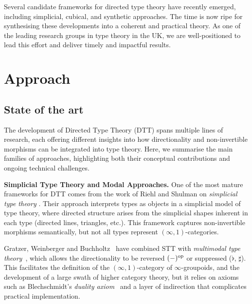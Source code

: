 \documentclass[a4paper,11pt]{article}
\renewcommand{\paragraph}[1]{\textbf{#1.}}
\begin{document}
Several candidate frameworks for directed type theory have recently
emerged, including simplicial, cubical, and synthetic approaches. The
time is now ripe for synthesising these developments into a coherent
and practical theory. As one of the leading research groups in type
theory in the UK, we are well-positioned to lead this effort and
deliver timely and impactful results.

\section{Approach} %


\subsection{State of the art}\label{state-of-the-art}

The development of Directed Type Theory (DTT) spans multiple lines of
research, each offering different insights into how directionality and
non-invertible morphisms can be integrated into type theory. Here, we
summarise the main families of approaches, highlighting both their
conceptual contributions and ongoing technical challenges.

\paragraph{Simplicial Type Theory and Modal Approaches}
One of the most mature frameworks for DTT comes from the work
of Riehl and Shulman on \emph{simplicial type theory}
\cite{riehlshulman2017}. Their approach interprets types as objects in
a simplicial model of type theory, where directed structure arises
from the simplicial shapes inherent in each type (directed lines, triangles, etc.).
This framework captures non-invertible morphisms
semantically, but not all types represent $(\infty,1)$-categories.

Gratzer, Weinberger and Buchholtz~\cite{gratzer2024directed,gratzer2025yoneda} have combined STT with \emph{multimodal type theory}~\cite{gratzer:2020}, which allows
the directionality to be reversed $(-)^{\textup{op}}$ or suppressed (\(\flat\), \(\sharp\)).
This facilitates the definition of the $(\infty,1)$-category of $\infty$-groupoids,
and the development of a large swath of higher category theory, but it relies on axioms
such as Blechschmidt's \emph{duality axiom}~\cite{blechschmidt:2023}
and a layer of
indirection that complicates practical implementation.
\end{document}
